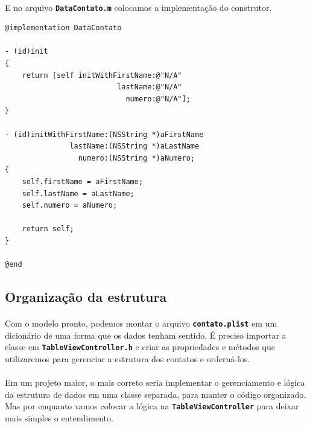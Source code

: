 \documentclass[a4paper,12pt,brazil,doubleside]{book}
\begin{document}
\pagebreak

\paragraph{}E no arquivo \texttt{\textbf{DataContato.m}} colocamos a implementação do construtor.

\begin{listing}
\begin{verbatim}
@implementation DataContato

- (id)init
{
    return [self initWithFirstName:@"N/A"
                          lastName:@"N/A"
                            numero:@"N/A"];
}

- (id)initWithFirstName:(NSString *)aFirstName
               lastName:(NSString *)aLastName
                 numero:(NSString *)aNumero;
{    
    self.firstName = aFirstName;
    self.lastName = aLastName;
    self.numero = aNumero;
    
    return self;
}

@end
\end{verbatim}
\end{listing}

\pagebreak

\subsection{Organização da estrutura}

\paragraph{}Com o modelo pronto, podemos montar o arquivo \texttt{\textbf{contato.plist}} em um dicionário de uma forma que os dados tenham sentido. É preciso importar a classe em \texttt{\textbf{TableViewController.h}} e criar as propriedades e métodos que utilizaremos para gerenciar a estrutura dos contatos e orderná-los.
\paragraph{}Em um projeto maior, o mais correto seria implementar o gerenciamento e lógica da estrutura de dados em uma classe separada, para manter o código organizado. Mas por enquanto vamos colocar a lógica na \texttt{\textbf{TableViewController}} para deixar mais simples o entendimento.
\end{document}
